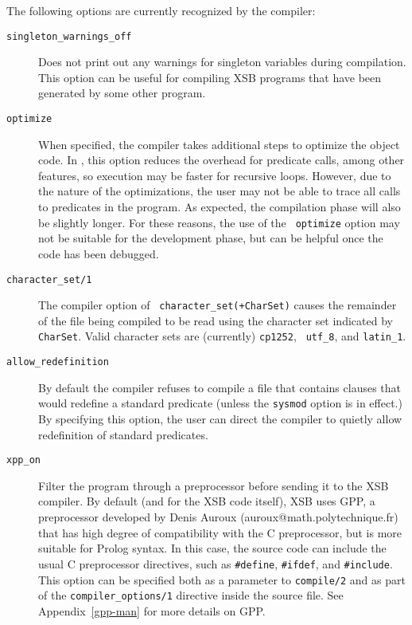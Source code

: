 The following options are currently recognized by the compiler:
\begin{description}
\item[{\tt singleton\_warnings\_off}] Does not print out any warnings
  for singleton variables during compilation.  This option can be
  useful for compiling XSB programs that have been generated by some
  other program.
%
\item[{\tt optimize}] When
  specified, the compiler takes additional steps to optimize the
  object code.  In \version, this option reduces the overhead for
  predicate calls, among other features, so execution may be faster
  for recursive loops.  However, due to the nature of the
  optimizations, the user may not be able to trace all calls to
  predicates in the program.  As expected, the compilation phase will
  also be slightly longer.  For these reasons, the use of the {\tt
    optimize} option may not be suitable for the development phase,
  but can be helpful once the code has been debugged.
%
\item[{\tt character\_set/1}] The compiler option of {\tt
  character\_set(+CharSet)} causes the remainder of the file being
  compiled to be read using the character set indicated by {\tt
    CharSet}.  Valid character sets are (currently) {\tt cp1252}, {\tt
    utf\_8}, and {\tt latin\_1}.
%
\item[{\tt allow\_redefinition}] 
	By default the compiler refuses to compile a file that
	contains clauses that would redefine a standard predicate
	(unless the {\tt sysmod} option is in effect.)  By specifying
	this option, the user can direct the compiler to quietly allow
	redefinition of standard predicates.
%
\item[{\tt xpp\_on}] Filter the program through a
  preprocessor before sending it to the XSB compiler. By default (and
  for the XSB code itself), XSB uses GPP, a preprocessor developed by
  Denis Auroux (auroux@math.polytechnique.fr) that has high degree of
  compatibility with the C preprocessor, but is more suitable for
  Prolog syntax. In this case, the source code can include the usual C
  preprocessor directives, such as \verb|#define|, \verb|#ifdef|, and
  \verb|#include|. This option can be specified both as a parameter to
       {\tt compile/2} and as part of the {\tt compiler\_options/1}
       directive inside the source file. See Appendix~\ref{gpp-man}
       for more details on GPP.


\end{description}
